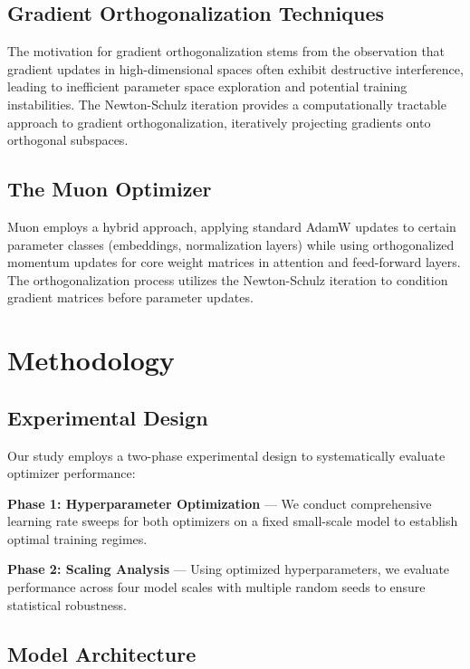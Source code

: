 \documentclass[11pt,a4paper]{article}
\begin{document}
\subsection{Gradient Orthogonalization Techniques}

The motivation for gradient orthogonalization stems from the observation that gradient updates in high-dimensional spaces often exhibit destructive interference, leading to inefficient parameter space exploration and potential training instabilities. The Newton-Schulz iteration provides a computationally tractable approach to gradient orthogonalization, iteratively projecting gradients onto orthogonal subspaces.

\subsection{The Muon Optimizer}

Muon employs a hybrid approach, applying standard AdamW updates to certain parameter classes (embeddings, normalization layers) while using orthogonalized momentum updates for core weight matrices in attention and feed-forward layers. The orthogonalization process utilizes the Newton-Schulz iteration to condition gradient matrices before parameter updates.

\section{Methodology}

\subsection{Experimental Design}

Our study employs a two-phase experimental design to systematically evaluate optimizer performance:

\textbf{Phase 1: Hyperparameter Optimization} — We conduct comprehensive learning rate sweeps for both optimizers on a fixed small-scale model to establish optimal training regimes.

\textbf{Phase 2: Scaling Analysis} — Using optimized hyperparameters, we evaluate performance across four model scales with multiple random seeds to ensure statistical robustness.

\subsection{Model Architecture}
\end{document}
